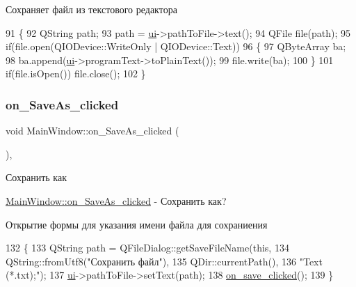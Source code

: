 Сохраняет файл из текстового редактора 
\begin{DoxyCode}
91 \{
92     QString path;
93     path = \hyperlink{class_main_window_a35466a70ed47252a0191168126a352a5}{ui}->pathToFile->text();
94     QFile file(path);
95     \textcolor{keywordflow}{if}(file.open(QIODevice::WriteOnly | QIODevice::Text))
96     \{
97         QByteArray ba;
98         ba.append(\hyperlink{class_main_window_a35466a70ed47252a0191168126a352a5}{ui}->programText->toPlainText());
99         file.write(ba);
100     \}
101     \textcolor{keywordflow}{if}(file.isOpen()) file.close();
102 \}
\end{DoxyCode}
\hypertarget{class_main_window_a55dfc7c049679ca635f6f629d5401d56}{}\label{class_main_window_a55dfc7c049679ca635f6f629d5401d56} 
\subsubsection{\texorpdfstring{on\+\_\+\+Save\+As\+\_\+clicked}{on\_SaveAs\_clicked}}
{\footnotesize\ttfamily void Main\+Window\+::on\+\_\+\+Save\+As\+\_\+clicked (\begin{DoxyParamCaption}{ }\end{DoxyParamCaption})\hspace{0.3cm}{\ttfamily [private]}, {\ttfamily [slot]}}



Сохранить как 

\hyperlink{class_main_window_a55dfc7c049679ca635f6f629d5401d56}{Main\+Window\+::on\+\_\+\+Save\+As\+\_\+clicked} -\/ Сохранить как?

Открытие формы для указания имени файла для сохраниения 
\begin{DoxyCode}
132 \{
133     QString path = QFileDialog::getSaveFileName(\textcolor{keyword}{this},
134                                 QString::fromUtf8(\textcolor{stringliteral}{"Сохранить файл"}),
135                                 QDir::currentPath(),
136                                 \textcolor{stringliteral}{"Text (*.txt);"});
137     \hyperlink{class_main_window_a35466a70ed47252a0191168126a352a5}{ui}->pathToFile->setText(path);
138     \hyperlink{class_main_window_a06fb14e8cace4221ee7a721c961934ce}{on\_save\_clicked}();
139 \}
\end{DoxyCode}
\hypertarget{class_main_window_a4b11549301823f52f40c90715cc70ec5}{}\label{class_main_window_a4b11549301823f52f40c90715cc70ec5} 
